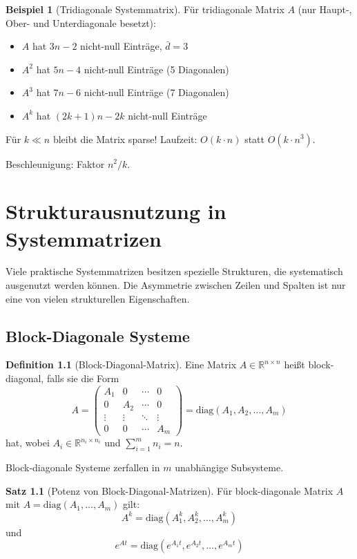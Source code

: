 \documentclass[a4paper,12pt]{report}
\theoremstyle{definition}
\newtheorem{definition}{Definition}
\newtheorem{beispiel}{Beispiel}
\newtheorem{satz}{Satz}
\begin{document}
	\begin{beispiel}[Tridiagonale Systemmatrix]
		Für tridiagonale Matrix $A$ (nur Haupt-, Ober- und Unterdiagonale besetzt):
		\begin{itemize}
			\item $A$ hat $3n - 2$ nicht-null Einträge, $\bar{d} = 3$
			\item $A^2$ hat $5n - 4$ nicht-null Einträge (5 Diagonalen)
			\item $A^3$ hat $7n - 6$ nicht-null Einträge (7 Diagonalen)
			\item $A^k$ hat $(2k+1)n - 2k$ nicht-null Einträge
		\end{itemize}
		
		Für $k \ll n$ bleibt die Matrix sparse! Laufzeit: $O(k \cdot n)$ statt $O(k \cdot n^3)$.
		
		Beschleunigung: Faktor $n^2 / k$.
	\end{beispiel}
	
	\chapter{Strukturausnutzung in Systemmatrizen}
	
	Viele praktische Systemmatrizen besitzen spezielle Strukturen, die systematisch ausgenutzt werden können. Die Asymmetrie zwischen Zeilen und Spalten ist nur eine von vielen strukturellen Eigenschaften.
	
	\section{Block-Diagonale Systeme}
	
	\begin{definition}[Block-Diagonal-Matrix]
		Eine Matrix $A \in \mathbb{R}^{n \times n}$ heißt block-diagonal, falls sie die Form
		\[
		A = \begin{pmatrix}
			A_1 & 0 & \cdots & 0 \\
			0 & A_2 & \cdots & 0 \\
			\vdots & \vdots & \ddots & \vdots \\
			0 & 0 & \cdots & A_m
		\end{pmatrix} = \text{diag}(A_1, A_2, \ldots, A_m)
		\]
		hat, wobei $A_i \in \mathbb{R}^{n_i \times n_i}$ und $\sum_{i=1}^m n_i = n$.
	\end{definition}
	
	Block-diagonale Systeme zerfallen in $m$ unabhängige Subsysteme.
	
	\begin{satz}[Potenz von Block-Diagonal-Matrizen]
		Für block-diagonale Matrix $A$ mit $A = \text{diag}(A_1, \ldots, A_m)$ gilt:
		\[
		A^k = \text{diag}(A_1^k, A_2^k, \ldots, A_m^k)
		\]
		und
		\[
		e^{At} = \text{diag}(e^{A_1 t}, e^{A_2 t}, \ldots, e^{A_m t})
		\]
	\end{satz}
	
\end{document}
